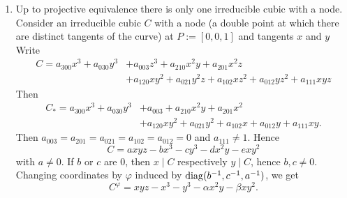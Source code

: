 \begin{example}
\begin{enumerate}
$$            \begin{pmatrix}
                1 & 0 & 0\\
                0 & 1 & 0\\
                A & B & 1
            \end{pmatrix}
            $$
            Then 
            \begin{align*}
                ((C^\varphi)^\phi)^\psi &= y^2(Ax+By+z)-x^3-Axy^2-By^3= y^2z-x^3 =: F.
            \end{align*}
            Then 
            $$
                \begin{cases}
                    F_x = 2x\\
                    F_y = 2yz\\
                    F_z = y^2
                \end{cases}
            $$
            Then we see that $[0,0,1]$ is a singularity. It is clear that it's the only singularity for $\Char \ K \neq 2$. In characteristic $2$ another candidate would be $[\alpha,0,\beta]$, $(\alpha,\beta )\neq 0$, but for such a point to be a zero of $F$, $\beta =0$. Therefor any irreducible cubic with a cusp has only one multiple point, namely the cusp.
            \item Up to projective equivalence there is only one irreducible cubic with a node. Consider an irreducible cubic $C$ with a node (a double point at which there are distinct tangents of the curve) at $P:=[0,0,1]$ and tangents $x$ and $y$
            Write 
            \begin{align*} 
                C=a_{300} x^3+a_{030}y^3&+a_{003}z^3+a_{210}x^2y+a_{201}x^2z\\&+ a_{120}xy^2+a_{021}y^2z+a_{102}xz^2+a_{012}yz^2+a_{111}xyz
            \end{align*}
            Then 
            \begin{align*} 
                C_\ast = a_{300} x^3+a_{030}y^3&+a_{003}+a_{210}x^2y+a_{201}x^2\\&+ a_{120}xy^2+a_{021}y^2+a_{102}x+a_{012}y+a_{111}xy.
            \end{align*}
            Then $a_{003}=a_{201}=a_{021}=a_{102}=a_{012}=0$ and $a_{111}\neq 1$. Hence
            $$C = axyz-bx^3-cy^3-dx^2y-exy^2$$
            with $a\neq 0$. If $b$ or $c$ are $0$, then $x\mid C$ respectively $y\mid C$, hence $b,c\neq 0$. Changing coordinates by $\varphi$ induced by $\mathrm{diag}(b^{-1},c^{-1},a^{-1})$, we get 
            $$C^\varphi = xyz-x^3-y^3-\alpha x^2y-\beta xy^2.$$

\end{enumerate}
\end{example}
